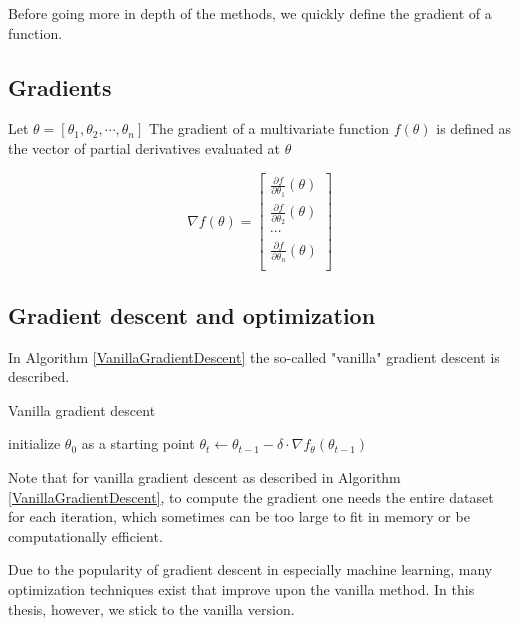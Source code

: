 Before going more in depth of the methods, we quickly define the gradient of a function.
\subsection{Gradients}
Let $\theta = [\theta_1, \theta_2, \cdots, \theta_n]$
The gradient of a multivariate function $f(\theta)$ is defined as the vector of partial derivatives evaluated at $\theta$

\[ \nabla f(\theta) = 
\begin{bmatrix}
\frac{\partial f}{\partial \theta_1}(\theta) \\
\frac{\partial f}{\partial \theta_2}(\theta) \\
\cdots \\
\frac{\partial f}{\partial \theta_n}(\theta) \\
\end{bmatrix}
\]

\subsection{Gradient descent and optimization}
In Algorithm \ref{VanillaGradientDescent} the so-called "vanilla" gradient descent is described.
\begin{algorithm}[H]
    \caption{Vanilla gradient descent} \label{VanillaGradientDescent}
\begin{algorithmic}[1]
    \State initialize $\theta_0$ as a starting point
    \State $\theta_t \gets \theta_{t-1} - \delta \cdot \nabla f_{\theta} (\theta_{t-1})$
    \EndWhile
\end{algorithmic}
\end{algorithm}

Note that for vanilla gradient descent as described in Algorithm \ref{VanillaGradientDescent}, to compute the gradient one needs the entire dataset for each iteration,
which sometimes can be too large to fit in memory or be computationally efficient.

Due to the popularity of gradient descent in especially machine learning, many optimization techniques exist that improve upon the vanilla method.
In this thesis, however, we stick to the vanilla version.
